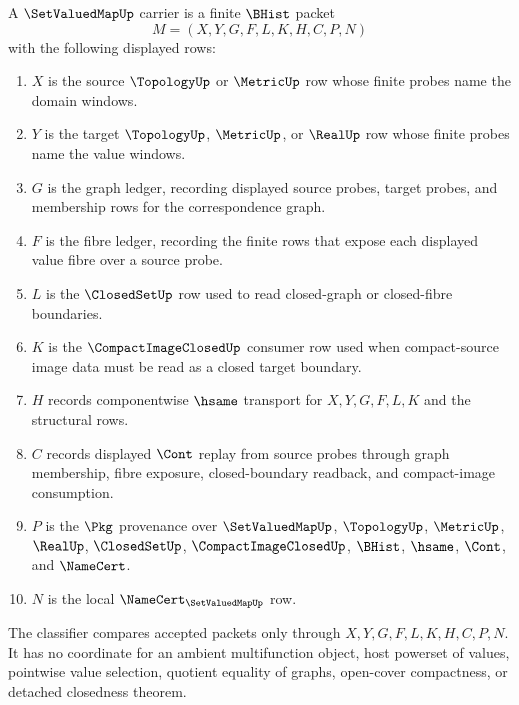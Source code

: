 \begin{definition}
\label{def:set-valued-map-carrier}
A $\SetValuedMapUp$ carrier is a finite $\BHist$ packet
$$
M=(X,Y,G,F,L,K,H,C,P,N)
$$
with the following displayed rows:
\begin{enumerate}
\item $X$ is the source $\TopologyUp$ or $\MetricUp$ row whose finite probes name the domain windows.
\item $Y$ is the target $\TopologyUp$, $\MetricUp$, or $\RealUp$ row whose finite probes name the value windows.
\item $G$ is the graph ledger, recording displayed source probes, target probes, and membership rows for the correspondence graph.
\item $F$ is the fibre ledger, recording the finite rows that expose each displayed value fibre over a source probe.
\item $L$ is the $\ClosedSetUp$ row used to read closed-graph or closed-fibre boundaries.
\item $K$ is the $\CompactImageClosedUp$ consumer row used when compact-source image data must be read as a closed target boundary.
\item $H$ records componentwise $\hsame$ transport for $X,Y,G,F,L,K$ and the structural rows.
\item $C$ records displayed $\Cont$ replay from source probes through graph membership, fibre exposure, closed-boundary readback, and compact-image consumption.
\item $P$ is the $\Pkg$ provenance over $\SetValuedMapUp$, $\TopologyUp$, $\MetricUp$, $\RealUp$, $\ClosedSetUp$, $\CompactImageClosedUp$, $\BHist$, $\hsame$, $\Cont$, and $\NameCert$.
\item $N$ is the local $\NameCert_{\SetValuedMapUp}$ row.
\end{enumerate}
The classifier compares accepted packets only through $X,Y,G,F,L,K,H,C,P,N$. It has no coordinate for an ambient multifunction object, host powerset of values, pointwise value selection, quotient equality of graphs, open-cover compactness, or detached closedness theorem.
\end{definition}

